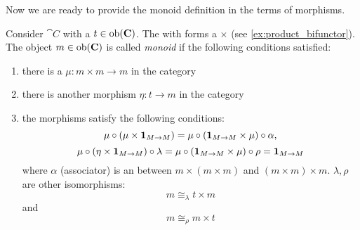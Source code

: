 Now we are ready to provide the monoid definition in the terms of morphisms.
\begin{definition}[Monoid]
\label{def:monoid_category}
Consider  $\cat{C}$ with a
 $t \in \mathrm{ob}(\mathbf{C})$. The 
with  forms a
 $\times$ (see \cref{ex:product_bifunctor}).
The object $m \in
\mathrm{ob}(\mathbf{C})$ is called \textit{monoid} if the following
conditions satisfied:
\begin{enumerate}
\item there is a  $\mu: m \times m \to m$ in
  the category
\item there is another morphism $\eta: t \to m$ in the category
\item the morphisms satisfy the following conditions:
\begin{equation}
\mu\circ\left(\mu \times
    \mathbf{1}_{ M \to M }\right) = \mu \circ \left(\mathbf{1}_{ M \to M } \times \mu\right) \circ
    \alpha,
\label{eq:monoid_def_mu}
\end{equation}
\begin{equation}
\mu \circ (\eta \times \mathbf{1}_{ M \to M })
\circ \lambda = \mu \circ (\mathbf{1}_{ M \to M } \times \mu) \circ \rho =
\mathbf{1}_{ M \to M }
\label{eq:monoid_def_eta}
\end{equation}
where $\alpha$ (associator) is an  between
$m \times (m \times m)$ and $(m \times m) \times m$. $\lambda, \rho$
are other isomorphisms:  
\[
m \cong_\lambda t \times m
\]
and
\[
m \cong_\rho m \times t 
\]
\end{enumerate}
\end{definition}

